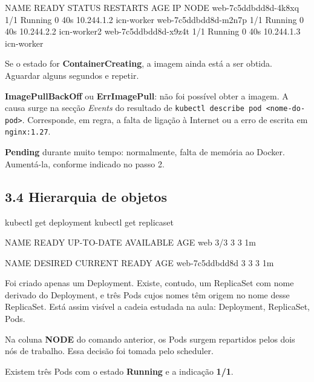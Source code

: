 \documentclass[11pt,a4paper]{article}
\newcommand{\cmd}[1]{\texttt{#1}}
\begin{document}
\begin{saida}
NAME                   READY   STATUS    RESTARTS   AGE   IP           NODE
web-7c5ddbdd8d-4k8xq   1/1     Running   0          40s   10.244.1.2   icn-worker
web-7c5ddbdd8d-m2n7p   1/1     Running   0          40s   10.244.2.2   icn-worker2
web-7c5ddbdd8d-x9z4t   1/1     Running   0          40s   10.244.1.3   icn-worker
\end{saida}

Se o estado for \textbf{ContainerCreating}, a imagem ainda está a ser obtida. Aguardar alguns segundos e repetir.

\begin{erro}
\textbf{ImagePullBackOff} ou \textbf{ErrImagePull}: não foi possível obter a imagem. A causa surge na secção \emph{Events} do resultado de \cmd{kubectl describe pod <nome-do-pod>}. Corresponde, em regra, a falta de ligação à Internet ou a erro de escrita em \cmd{nginx:1.27}.

\textbf{Pending} durante muito tempo: normalmente, falta de memória ao Docker. Aumentá-la, conforme indicado no passo 2.
\end{erro}

\subsection*{3.4 Hierarquia de objetos}

\begin{terminal}
kubectl get deployment
kubectl get replicaset
\end{terminal}

\begin{saida}
NAME   READY   UP-TO-DATE   AVAILABLE   AGE
web    3/3     3            3           1m

NAME             DESIRED   CURRENT   READY   AGE
web-7c5ddbdd8d   3         3         3       1m
\end{saida}

\begin{observe}
Foi criado apenas um Deployment. Existe, contudo, um ReplicaSet com nome derivado do Deployment, e três Pods cujos nomes têm origem no nome desse ReplicaSet. Está assim visível a cadeia estudada na aula: Deployment, ReplicaSet, Pods.

Na coluna \textbf{NODE} do comando anterior, os Pods surgem repartidos pelos dois nós de trabalho. Essa decisão foi tomada pelo scheduler.
\end{observe}

\begin{feito}
Existem três Pods com o estado \textbf{Running} e a indicação \textbf{1/1}.
\end{feito}
\end{document}
